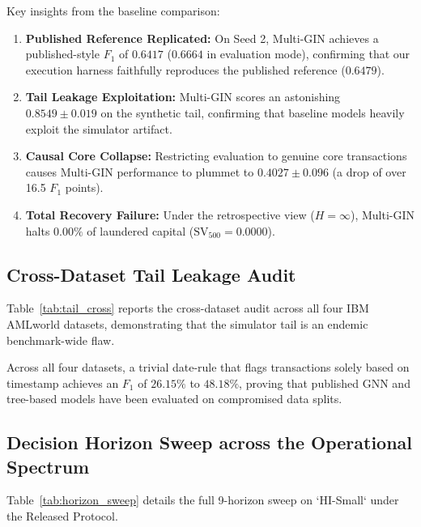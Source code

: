 \documentclass[11pt,a4paper]{article}
\begin{document}
Key insights from the baseline comparison:
\begin{enumerate}[leftmargin=*]
    \item \textbf{Published Reference Replicated:} On Seed 2, Multi-GIN achieves a published-style $F_1$ of \textbf{$0.6417$} ($0.6664$ in evaluation mode), confirming that our execution harness faithfully reproduces the published reference ($0.6479$).
    \item \textbf{Tail Leakage Exploitation:} Multi-GIN scores an astonishing \textbf{$0.8549 \pm 0.019$} on the synthetic tail, confirming that baseline models heavily exploit the simulator artifact.
    \item \textbf{Causal Core Collapse:} Restricting evaluation to genuine core transactions causes Multi-GIN performance to plummet to \textbf{$0.4027 \pm 0.096$} (a drop of over 16.5 $F_1$ points).
    \item \textbf{Total Recovery Failure:} Under the retrospective view ($H=\infty$), Multi-GIN halts $0.00\%$ of laundered capital ($\text{SV}_{500} = 0.0000$).
\end{enumerate}

\subsection{Cross-Dataset Tail Leakage Audit}
Table~\ref{tab:tail_cross} reports the cross-dataset audit across all four IBM AMLworld datasets, demonstrating that the simulator tail is an endemic benchmark-wide flaw.

\begin{table}[ht]
\centering
\small
\caption{\textbf{Cross-Dataset Tail Leakage Audit across the IBM AMLworld Suite.}}
\label{tab:tail_cross}
\resizebox{\textwidth}{!}{%
%
}
\end{table}

Across all four datasets, a trivial date-rule that flags transactions solely based on timestamp achieves an $F_1$ of $26.15\%$ to $48.18\%$, proving that published GNN and tree-based models have been evaluated on compromised data splits.

\subsection{Decision Horizon Sweep across the Operational Spectrum}
Table~\ref{tab:horizon_sweep} details the full 9-horizon sweep on `HI-Small` under the Released Protocol.

\begin{table}[t]
\centering
\small
\caption{\textbf{Decision Horizon Sweep on `HI-Small' (Released Protocol).}}
\label{tab:horizon_sweep}
\resizebox{\textwidth}{!}{%
%
}
\end{table}
\end{document}
